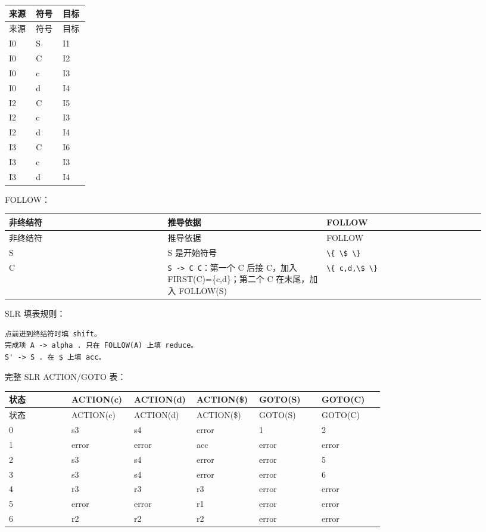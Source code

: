 \documentclass[UTF8]{ctexart}
\begin{document}
\begin{longtable}{|p{0.31\linewidth}|p{0.31\linewidth}|p{0.31\linewidth}|}
\hline
来源 & 符号 & 目标 \\
\hline
\endfirsthead
来源 & 符号 & 目标 \\
\hline
\endhead
I0 & S & I1 \\
\hline
I0 & C & I2 \\
\hline
I0 & c & I3 \\
\hline
I0 & d & I4 \\
\hline
I2 & C & I5 \\
\hline
I2 & c & I3 \\
\hline
I2 & d & I4 \\
\hline
I3 & C & I6 \\
\hline
I3 & c & I3 \\
\hline
I3 & d & I4 \\
\hline
\end{longtable}

FOLLOW：

\begin{longtable}{|p{0.31\linewidth}|p{0.31\linewidth}|p{0.31\linewidth}|}
\hline
非终结符 & 推导依据 & FOLLOW \\
\hline
\endfirsthead
非终结符 & 推导依据 & FOLLOW \\
\hline
\endhead
S & S 是开始符号 & \texttt{\textbackslash{}\{ \textbackslash{}\$ \textbackslash{}\}} \\
\hline
C & \texttt{S -> C C}：第一个 C 后接 C，加入 FIRST(C)=\{c,d\}；第二个 C 在末尾，加入 FOLLOW(S) & \texttt{\textbackslash{}\{ c,d,\textbackslash{}\$ \textbackslash{}\}} \\
\hline
\end{longtable}

SLR 填表规则：

\begin{Verbatim}[fontsize=\small,breaklines=true]
点前进到终结符时填 shift。
完成项 A -> alpha . 只在 FOLLOW(A) 上填 reduce。
S' -> S . 在 $ 上填 acc。
\end{Verbatim}

完整 SLR ACTION/GOTO 表：

\begin{longtable}{|p{0.16\linewidth}|p{0.16\linewidth}|p{0.16\linewidth}|p{0.16\linewidth}|p{0.16\linewidth}|p{0.16\linewidth}|}
\hline
状态 & ACTION(c) & ACTION(d) & ACTION(\$) & GOTO(S) & GOTO(C) \\
\hline
\endfirsthead
状态 & ACTION(c) & ACTION(d) & ACTION(\$) & GOTO(S) & GOTO(C) \\
\hline
\endhead
0 & s3 & s4 & error & 1 & 2 \\
\hline
1 & error & error & acc & error & error \\
\hline
2 & s3 & s4 & error & error & 5 \\
\hline
3 & s3 & s4 & error & error & 6 \\
\hline
4 & r3 & r3 & r3 & error & error \\
\hline
5 & error & error & r1 & error & error \\
\hline
6 & r2 & r2 & r2 & error & error \\
\hline
\end{longtable}
\end{document}
